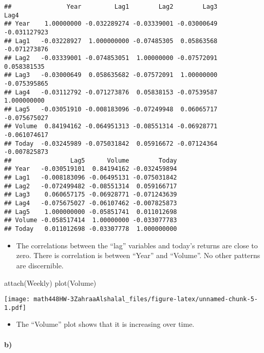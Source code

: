 \documentclass[
]{article}
\newenvironment{Shaded}{\begin{snugshade}}{\end{snugshade}}
\newcommand{\FunctionTok}[1]{\textcolor[rgb]{0.00,0.00,0.00}{#1}}
\newcommand{\NormalTok}[1]{#1}
\providecommand{\tightlist}{%
  \setlength{\itemsep}{0pt}\setlength{\parskip}{0pt}}
\begin{document}
\begin{verbatim}
##               Year         Lag1        Lag2        Lag3         Lag4
## Year    1.00000000 -0.032289274 -0.03339001 -0.03000649 -0.031127923
## Lag1   -0.03228927  1.000000000 -0.07485305  0.05863568 -0.071273876
## Lag2   -0.03339001 -0.074853051  1.00000000 -0.07572091  0.058381535
## Lag3   -0.03000649  0.058635682 -0.07572091  1.00000000 -0.075395865
## Lag4   -0.03112792 -0.071273876  0.05838153 -0.07539587  1.000000000
## Lag5   -0.03051910 -0.008183096 -0.07249948  0.06065717 -0.075675027
## Volume  0.84194162 -0.064951313 -0.08551314 -0.06928771 -0.061074617
## Today  -0.03245989 -0.075031842  0.05916672 -0.07124364 -0.007825873
##                Lag5      Volume        Today
## Year   -0.030519101  0.84194162 -0.032459894
## Lag1   -0.008183096 -0.06495131 -0.075031842
## Lag2   -0.072499482 -0.08551314  0.059166717
## Lag3    0.060657175 -0.06928771 -0.071243639
## Lag4   -0.075675027 -0.06107462 -0.007825873
## Lag5    1.000000000 -0.05851741  0.011012698
## Volume -0.058517414  1.00000000 -0.033077783
## Today   0.011012698 -0.03307778  1.000000000
\end{verbatim}

\begin{itemize}
\tightlist
\item
  The correlations between the ``lag'' variables and today's returns are
  close to zero. There is correlation is between ``Year'' and
  ``Volume''. No other patterns are discernible.\\
\end{itemize}

\begin{Shaded}
\begin{Highlighting}[]
\FunctionTok{attach}\NormalTok{(Weekly)}
\FunctionTok{plot}\NormalTok{(Volume)}
\end{Highlighting}
\end{Shaded}

\texttt{[image: math448HW-3ZahraaAlshalal\_files/figure-latex/unnamed-chunk-5-1.pdf]}

\begin{itemize}
\tightlist
\item
  The ``Volume'' plot shows that it is increasing over time.
\end{itemize}

\hypertarget{b}{%
\paragraph{b)}\label{b}}
\end{document}
